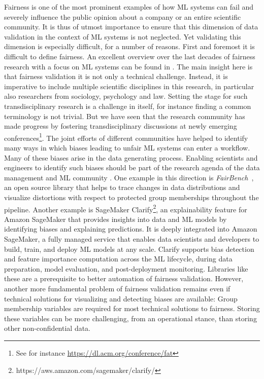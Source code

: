 Fairness is one of the most prominent examples of how ML systems can fail and severely influence the public opinion about a company or an entire scientific community. It is thus of utmost importance to ensure that this dimension of data validation in the context of ML systems is not neglected. Yet validating this dimension is especially difficult, for a number of reasons. First and foremost it is difficult to define fairness. An excellent overview over the last decades of fairness research with a focus on ML systems can be found in \cite{Mehrabi2019}. The main insight here is that fairness validation it is not only a technical challenge. Instead, it is imperative to include multiple scientific disciplines in this research, in particular also researchers from sociology, psychology and law. Setting the stage for such transdisciplinary research is a challenge in itself, for instance finding a common terminology is not trivial. But we have seen that the research community has made progress by fostering transdisciplinary discussions at newly emerging conferences\footnote{See for instance \url{https://dl.acm.org/conference/fat}}. The joint efforts of different communities have helped to identify many ways in which biases leading to unfair ML systems can enter a workflow. Many of these biases arise in the data generating process. Enabling scientists and engineers to identify such biases should be part of the research agenda of the data management and ML community \cite{Stoyanovich2020}. One example in this direction is {\em FairBench}~\cite{Yang2020}, an open source library that helps to trace changes in data distributions and visualize distortions with respect to protected group memberships throughout the pipeline. Another example is SageMaker Clarify\footnote{https://aws.amazon.com/sagemaker/clarify/}, an explainability feature for Amazon SageMaker that provides insights into data and ML models by identifying biases and explaining predictions. It is deeply integrated into Amazon SageMaker, a fully managed service that enables data scientists and developers to build, train, and deploy ML models at any scale. Clarify supports bias detection and feature importance computation across the ML lifecycle, during data preparation, model evaluation, and post-deployment monitoring. Libraries like these  are a prerequisite to better automation of fairness validation.
%
However, another more fundamental problem of fairness validation remains even if technical solutions for visualizing and detecting biases are available: Group membership variables are required for most technical solutions to fairness. Storing these variables can
be more challenging, from an operational stance, than storing other non-confidential data.


